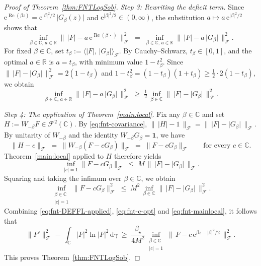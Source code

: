 \documentclass[11pt]{amsart}
\theoremstyle{remark}
\newcommand{\C}{\mathbb{C}}
\newcommand{\abs}[1]{\lvert #1 \rvert}
\newcommand{\norm}[1]{\lVert #1 \rVert}
\newcommand{\dd}{\mathrm{d}}
\newcommand{\ee}{\mathrm{e}}
\begin{document}
\begin{proof}[Proof of Theorem~\ref{thm:FNTLogSob}]
\medskip
\noindent
\emph{Step 3: Rewriting the deficit term.}\;
Since $\ee^{\operatorname{Re}(\beta z)}
= \ee^{\abs{\beta}^2/2}\, \abs{G_\beta(z)}$ and
$\ee^{\abs{\beta}^2/2} \in (0, \infty)$, the substitution
$a \mapsto a\, \ee^{\abs{\beta}^2/2}$ shows that
\[
\inf_{\beta \in \C,\, a \in \mathbb{R}}
\norm{\, \abs{F} - a\, \ee^{\operatorname{Re}(\beta\,\cdot\,)} \,}_{\mathcal{F}}^2
\;=\;
\inf_{\beta \in \C,\, a \in \mathbb{R}}
\norm{\, \abs{F} - a\, \abs{G_\beta} \,}_{\mathcal{F}}^2.
\]
For fixed $\beta \in \C$, set $t_\beta := \langle \abs{F},\, \abs{G_\beta} \rangle_{\mathcal{F}}$.
By Cauchy--Schwarz, $t_\beta \in [0, 1]$, and the optimal $a \in \mathbb{R}$ is
$a = t_\beta$, with minimum value $1 - t_\beta^2$.  Since
$\norm{\, \abs{F} - \abs{G_\beta} \,}_{\mathcal{F}}^2 = 2(1 - t_\beta)$
and
$1 - t_\beta^2 = (1 - t_\beta)(1 + t_\beta) \ge \tfrac{1}{2}\cdot 2(1 - t_\beta)$,
we obtain
\begin{equation}\label{eq:fnt-c-opt}
\inf_{\beta \in \C,\, a \in \mathbb{R}}
\norm{\, \abs{F} - a\, \abs{G_\beta} \,}_{\mathcal{F}}^2
\;\ge\;
\tfrac{1}{2}\, \inf_{\beta \in \C}
\norm{\, \abs{F} - \abs{G_\beta} \,}_{\mathcal{F}}^2.
\end{equation}

\medskip
\noindent
\emph{Step 4: The application of Theorem~\ref{main:local}.}\;
Fix any $\beta \in \C$ and set $H := W_{-\beta} F \in \mathcal{F}^2(\C)$.
By \eqref{eq:fnt-covariance},
$\norm{\, \abs{H} - 1 \,}_{\mathcal{F}}
= \norm{\, \abs{F} - \abs{G_\beta} \,}_{\mathcal{F}}$.
By unitarity of $W_{-\beta}$ and the identity $W_{-\beta} G_\beta = \mathbf{1}$, we have
\[
\norm{H - c}_{\mathcal{F}}
\;=\; \norm{W_{-\beta}(F - c G_\beta)}_{\mathcal{F}}
\;=\; \norm{F - c G_\beta}_{\mathcal{F}}
\qquad \text{for every } c \in \C.
\]
Theorem~\ref{main:local} applied to $H$ therefore yields
\[
\inf_{\abs{c}=1} \norm{F - c G_\beta}_{\mathcal{F}}
\;\le\; M\, \norm{\, \abs{F} - \abs{G_\beta} \,}_{\mathcal{F}}.
\]
Squaring and taking the infimum over $\beta \in \C$, we obtain
\begin{equation}\label{eq:fnt-mainlocal}
\inf_{\substack{\beta \in \C \\ \abs{c}=1}}
\norm{F - c G_\beta}_{\mathcal{F}}^2
\;\le\;
M^2\, \inf_{\beta \in \C}
\norm{\, \abs{F} - \abs{G_\beta} \,}_{\mathcal{F}}^2.
\end{equation}
Combining \eqref{eq:fnt-DEFFL-applied}, \eqref{eq:fnt-c-opt} and
\eqref{eq:fnt-mainlocal}, it follows that
\[
\norm{F'}_{\mathcal{F}}^2
\,-\, \int_{\C} \abs{F}^2 \ln \abs{F}^2\, \dd\gamma
\;\ge\;
\frac{\beta_\star}{4 M^2}
\inf_{\substack{\beta \in \C \\ \abs{c}=1}}
\norm{\, F - c\, \ee^{\beta z - \abs{\beta}^2/2} \,}_{\mathcal{F}}^2.
\]
This proves Theorem~\ref{thm:FNTLogSob}.
\end{proof}
\end{document}
